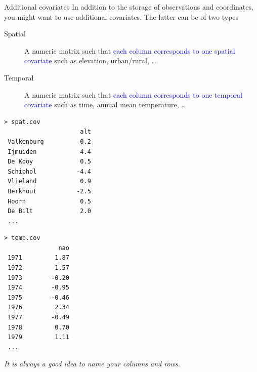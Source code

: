 \message{ !name(showv2.tex)}\documentclass[mode=present,style=simple]{powerdot}
\theoremstyle{plain}%
\theoremstyle{definition}
\theoremstyle{remark}
\newcommand{\advice}[1]{\HandPencilLeft{} \emph{#1}}
\begin{document}
\begin{slide}[toc=,method=direct]{Additional covariates}
  In addition to the storage of observations and coordinates, you
  might want to use additional covariates. The latter can be of two
  types
  \begin{description}
  \item[Spatial] A numeric matrix such that \textcolor{blue}{each
      column corresponds to one spatial covariate} such as elevation,
    urban/rural, \ldots
  \item[Temporal] A numeric matrix such that \textcolor{blue}{each
      column corresponds to one temporal covariate} such as time,
    annual mean temperature, \ldots
  \end{description}
{\tiny
  \begin{minipage}[l]{.49\linewidth}
\begin{verbatim}
> spat.cov
                     alt
 Valkenburg         -0.2
 Ijmuiden            4.4
 De Kooy             0.5
 Schiphol           -4.4
 Vlieland            0.9
 Berkhout           -2.5
 Hoorn               0.5
 De Bilt             2.0
 ...
\end{verbatim}
  \end{minipage}%
  \begin{minipage}[r]{.49\linewidth}
\begin{verbatim}
> temp.cov
               nao
 1971         1.87
 1972         1.57
 1973        -0.20
 1974        -0.95
 1975        -0.46
 1976         2.34
 1977        -0.49
 1978         0.70
 1979         1.11
 ...
\end{verbatim}
  \end{minipage}
}

\advice{It is always a good idea to name your columns and rows.}
\end{slide}
\end{document}

